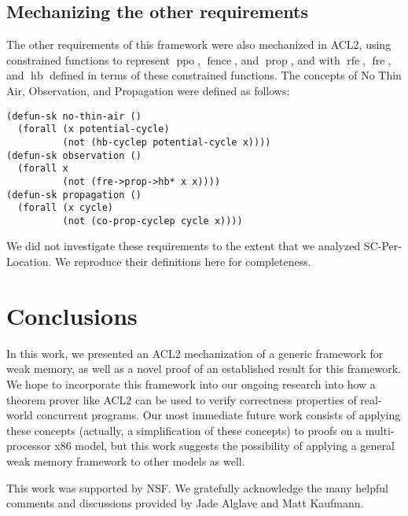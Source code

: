 \documentclass[]{eptcs}
\DeclareMathOperator{\rfe}{rfe}
\DeclareMathOperator{\fre}{fre}
\DeclareMathOperator{\hb}{hb}
\DeclareMathOperator{\ppo}{ppo}
\DeclareMathOperator{\fence}{fence}
\DeclareMathOperator{\prop}{prop}
\begin{document}
\subsection{Mechanizing the other requirements}
The other requirements of this framework were also mechanized in ACL2, using constrained functions to represent $\ppo$, $\fence$, and $\prop$, and with $\rfe$, $\fre$, and $\hb$ defined in terms of these constrained functions. The concepts of No Thin Air, Observation, and Propagation were defined as follows:
\begin{verbatim}
(defun-sk no-thin-air ()
  (forall (x potential-cycle)
          (not (hb-cyclep potential-cycle x))))
(defun-sk observation ()
  (forall x
          (not (fre->prop->hb* x x))))
(defun-sk propagation ()
  (forall (x cycle)
          (not (co-prop-cyclep cycle x))))
\end{verbatim}
We did not investigate these requirements to the extent that we analyzed SC-Per-Location. We reproduce their definitions here for completeness.

\section{Conclusions}

In this work, we presented an ACL2 mechanization of a generic framework for weak memory, as well as a novel proof of an established result for this framework. We hope to incorporate this framework into our ongoing research into how a theorem prover like ACL2 can be used to verify correctness properties of real-world concurrent programs. Our most immediate future work consists of applying these concepts (actually, a simplification of these concepts) to proofs on a multi-processor x86 model, but this work suggests the possibility of applying a general weak memory framework to other models as well.

This work was supported by NSF. We gratefully acknowledge the many helpful comments and discussions provided by Jade Alglave and Matt Kaufmann.



\end{document}
